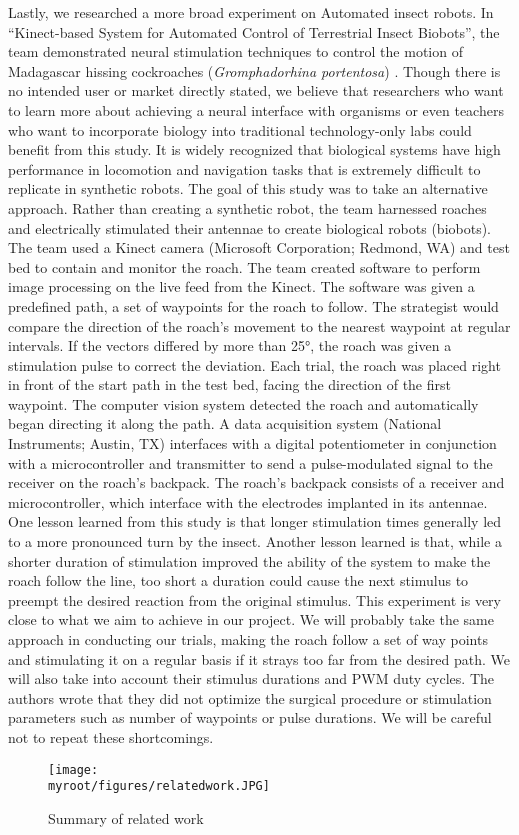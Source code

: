 \documentclass[twocolumn,10pt]{IEEEtran}
\newcommand{\myroot}{.}
\begin{document}
Lastly, we researched a more broad experiment on Automated insect robots. In ``Kinect-based System for Automated Control of Terrestrial Insect Biobots'', the team demonstrated neural stimulation techniques to control the motion of Madagascar hissing cockroaches (\emph{Gromphadorhina portentosa}) \cite{whitmire2013kinect}. Though there is no intended user or market directly stated, we believe that researchers who want to learn more about achieving a neural interface with organisms or even teachers who want to incorporate biology into traditional technology-only labs could benefit from this study. It is widely recognized that biological systems have high performance in locomotion and navigation tasks that is extremely difficult to replicate in synthetic robots. The goal of this study was to take an alternative approach. Rather than creating a synthetic robot, the team harnessed roaches and electrically stimulated their antennae to create biological robots (biobots). The team used a Kinect camera (Microsoft Corporation; Redmond, WA) and test bed to contain and monitor the roach. The team created software to perform image processing on the live feed from the Kinect. The software was given a predefined path, a set of waypoints for the roach to follow. The strategist would compare the direction of the roach’s movement to the nearest waypoint at regular intervals. If the vectors differed by more than \ang{25}, the roach was given a stimulation pulse to correct the deviation. Each trial, the roach was placed right in front of the start path in the test bed, facing the direction of the first waypoint. The computer vision system detected the roach and automatically began directing it along the path. A data acquisition system (National Instruments; Austin, TX) interfaces with a digital potentiometer in conjunction with a microcontroller and transmitter to send a pulse-modulated signal to the receiver on the roach’s backpack. The roach’s backpack consists of a receiver and microcontroller, which interface with the electrodes implanted in its antennae. One lesson learned from this study is that longer stimulation times generally led to a more pronounced turn by the insect. Another lesson learned is that, while a shorter duration of stimulation improved the ability of the system to make the roach follow the line, too short a duration could cause the next stimulus to preempt the desired reaction from the original stimulus. This experiment is very close to what we aim to achieve in our project. We will probably take the same approach in conducting our trials, making the roach follow a set of way points and stimulating it on a regular basis if it strays too far from the desired path. We will also take into account their stimulus durations and PWM duty cycles. The authors wrote that they did not optimize the surgical procedure or stimulation parameters such as number of waypoints or pulse durations. We will be careful not to repeat these shortcomings.
\begin{figure}[ht!]
\centering
\texttt{[image: \\myroot/figures/relatedwork.JPG]}
\caption{Summary of related work}
\label{fig:relatedwork}
\end{figure}
\end{document}
